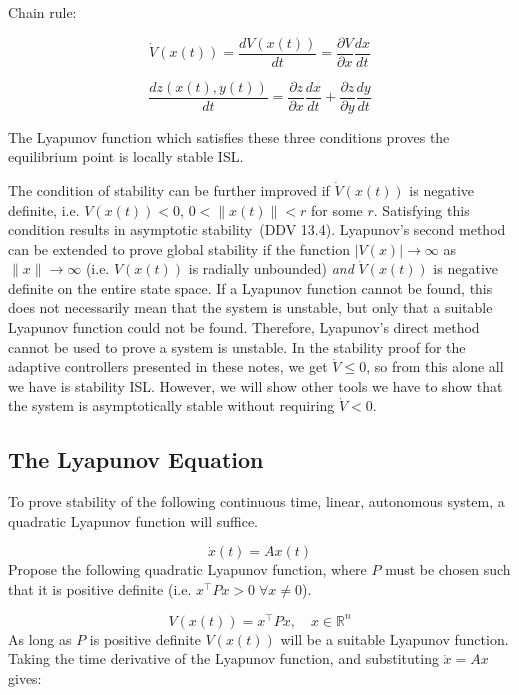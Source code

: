 Chain rule:

\begin{equation*}
  \dot{V}(x(t))=\frac{dV(x(t))}{dt}=\frac{\partial{}V}{\partial{}x}\frac{dx}{dt}
\end{equation*}

\begin{equation*}
  \frac{dz(x(t),y(t))}{dt}=\frac{\partial{}z}{\partial{}x}\frac{dx}{dt}+\frac{\partial{}z}{\partial{}y}\frac{dy}{dt}
\end{equation*}

The Lyapunov function which satisfies these three conditions proves the equilibrium point is locally stable ISL.\@

The condition of stability can be further improved if $\dot{V}(x(t))$ is negative definite, i.e.
$V(x(t))<0$, $0<\|x(t)\|<r$ for some $r$.
Satisfying this condition results in asymptotic stability\ (DDV 13.4).
Lyapunov's second method can be extended to prove global stability if the function $|V(x)|\rightarrow\infty$ as $\|x\|\rightarrow\infty$ (i.e.
$V(x(t))$ is radially unbounded) \textit{and} $\dot{V}(x(t))$ is negative definite on the entire state space.
If a Lyapunov function cannot be found, this does not necessarily mean that the system is unstable, but only that a suitable Lyapunov function could not be found.
Therefore, Lyapunov's direct method cannot be used to prove a system is unstable.
In the stability proof for the adaptive controllers presented in these notes, we get $\dot{V}\leq0$, so from this alone all we have is stability ISL.\@
However, we will show other tools we have to show that the system is asymptotically stable without requiring $\dot{V}<0$.

\subsection{The Lyapunov Equation}

To prove stability of the following continuous time, linear, autonomous system, a quadratic Lyapunov function will suffice.

\begin{equation*}
  \dot{x}(t)=Ax(t)
\end{equation*}
Propose the following quadratic Lyapunov function, where $P$ must be chosen such that it is positive definite (i.e.
$x^{\top}Px>0\;\forall x\neq0$).

\begin{equation*}
  V(x(t))=x^{\top}Px,
  \quad
  x\in \mathbb{R}^{n}
\end{equation*}
As long as $P$ is positive definite $V(x(t))$ will be a suitable Lyapunov function.
Taking the time derivative of the Lyapunov function, and substituting $\dot{x}=Ax$ gives:

